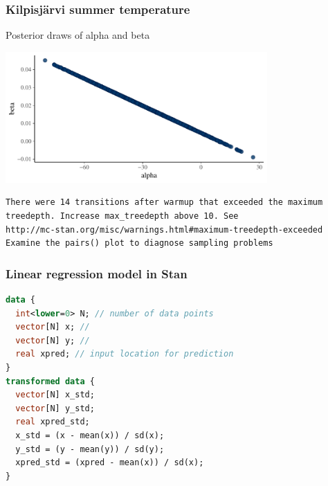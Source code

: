 \documentclass[10pt,handout]{beamer}
\begin{document}
\begin{frame}[fragile]

\frametitle{Kilpisjärvi summer temperature}

  Posterior draws of alpha and beta

  \begin{center}
    \includegraphics[width=10cm]{figs/kilpis_lin_mcmc_scatter.pdf}
  \end{center}

{\scriptsize
\begin{lstlisting}
There were 14 transitions after warmup that exceeded the maximum
treedepth. Increase max_treedepth above 10. See
http://mc-stan.org/misc/warnings.html#maximum-treedepth-exceeded
Examine the pairs() plot to diagnose sampling problems
\end{lstlisting}
}

\end{frame}

\begin{frame}[fragile]

\frametitle{Linear regression model in Stan}

  {\scriptsize
\begin{lstlisting}[language=Stan]
data {
  int<lower=0> N; // number of data points
  vector[N] x; //
  vector[N] y; //
  real xpred; // input location for prediction
}
transformed data {
  vector[N] x_std;
  vector[N] y_std;
  real xpred_std;
  x_std = (x - mean(x)) / sd(x);
  y_std = (y - mean(y)) / sd(y);
  xpred_std = (xpred - mean(x)) / sd(x);
}
\end{lstlisting}
  }
\end{frame}

\end{document}
